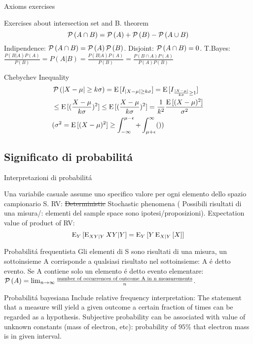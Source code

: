 \documentclass[asd-beamer.tex]{subfiles}
\begin{document}
\begin{wordonframe}{Axioms exercises}
\begin{block}{Exercises about intersection set and B. theorem}
\[\operatorname{\mathcal{P}}{(A\cap B)}=\operatorname{\mathcal{P}}{(A)}+\operatorname{\mathcal{P}}{(B)}-\operatorname{\mathcal{P}}{(A\cup B)}\]
Indipendence: $\operatorname{\mathcal{P}}{(A\cap B)}=\operatorname{\mathcal{P}}{(A)}\operatorname{\mathcal{P}}{(B)}$.
Disjoint: $\operatorname{\mathcal{P}}{(A\cap B)}=0$.
T.Bayes: $\frac{P(B|A)P(A)}{P(B)}=P(A|B)=\frac{P(B|A)P(A)}{P(B)}=\frac{P(B\cap A)P(A)}{P(A)P(B)}$
\end{block}
\begin{block}{Chebychev Inequality}
\begin{align*}
&\operatorname{\mathcal{P}}{(|X-\mu|\geq k\sigma)}=\operatorname{E}{[I_{|X-\mu|\geq k\sigma}]}=\operatorname{E}{[I_{\frac{|X-\mu|}{k\sigma}\geq 1}]}\\
&\leq\operatorname{E}{[(\frac{X-\mu}{k\sigma})^2]}\leq\operatorname{E}{[(\frac{X-\mu}{k\sigma})^2]}=\frac{1}{k^2}\frac{\operatorname{E}{[(X-\mu)^2]}}{\sigma^2}\\
&(\sigma^2=\operatorname{E}{[(X-\mu)^2]}\geq\int_{-\infty}^{\mu-\epsilon}+\int_{\mu+\epsilon}^{\infty}())
\end{align*}
\end{block}
\end{wordonframe}

\subsection{Significato di probabilit\'a}

\begin{frame}{Interpretazioni di probabilit\'a}
\begin{block}{Una variabile casuale assume uno specifico valore per ogni elemento dello spazio campionario S.}
RV: \sout{Deterministic} Stochastic phenomena ( Possibili risultati di una misura/: elementi del sample space sono ipotesi/proposizioni). Expectation value of product of RV:%
\[\operatorname{E}_Y{[\operatorname{E}_{XY|Y}{XY|Y}]}=\operatorname{E}_Y{[Y\operatorname{E}_{X|Y}{[X]}]}\]
\end{block}
\begin{block}{Probabilit\'a frequentista}
Gli elementi di S sono risultati di una misura, un sottoinsieme A corrisponde a qualsiasi risultato nel sottoinsieme: A \'e detto evento. Se A contiene solo un elemento \'e detto evento elementare: $\operatorname{\mathcal{P}}{(A)}=\lim_{n\to\infty}\frac{\text{number of occurrences of outcome A in n measurements}}{n}$.
\end{block}
\begin{block}{Probabilit\'a bayesiana}
Include relative frequency interpretation: The statement that a measure will yield a given outcome a certain fraction of times can be regarded as a hypothesis.
Subjective probability can be associated with value of unknown constants (mass of electron, etc): probability of $95\%$ that electron mass is in given interval.
\end{block}
\end{frame}
\end{document}
